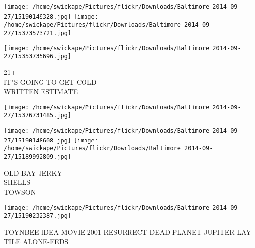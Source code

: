 \documentclass[10pt,letterpaper]{article}
\begin{document}
\texttt{[image: /home/swickape/Pictures/flickr/Downloads/Baltimore 2014-09-27/15190149328.jpg]}
\texttt{[image: /home/swickape/Pictures/flickr/Downloads/Baltimore 2014-09-27/15373573721.jpg]}

\texttt{[image: /home/swickape/Pictures/flickr/Downloads/Baltimore 2014-09-27/15353735696.jpg]}

21+\\
IT"S GOING TO GET COLD\\
WRITTEN ESTIMATE\\
\pagebreak

\texttt{[image: /home/swickape/Pictures/flickr/Downloads/Baltimore 2014-09-27/15376731485.jpg]}

\vspace{0.25in}
\texttt{[image: /home/swickape/Pictures/flickr/Downloads/Baltimore 2014-09-27/15190148608.jpg]}
\texttt{[image: /home/swickape/Pictures/flickr/Downloads/Baltimore 2014-09-27/15189992809.jpg]}

OLD BAY JERKY\\
SHELLS\\
TOWSON\\
\pagebreak

\texttt{[image: /home/swickape/Pictures/flickr/Downloads/Baltimore 2014-09-27/15190232387.jpg]}

TOYNBEE IDEA MOVIE 2001 RESURRECT DEAD PLANET JUPITER LAY TILE ALONE{-}FEDS\\
\pagebreak
\end{document}
